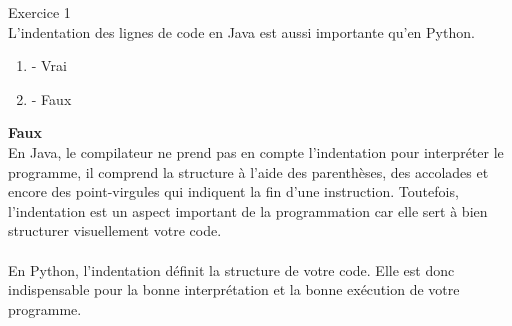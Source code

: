 \begin{Exercice}[2 minutes] Exercice 1\\
L'indentation des lignes de code en Java est aussi importante qu'en Python.
\begin{enumerate}
    \item - Vrai
    \item - Faux
\end{enumerate}
\begin{solution}
    \textbf{Faux}
    \\En Java, le compilateur ne prend pas en compte l'indentation pour interpréter le programme, il comprend la structure à l'aide des parenthèses, des accolades et encore des point-virgules qui indiquent la fin d'une instruction. Toutefois, l'indentation est un aspect important de la programmation car elle sert à bien structurer visuellement votre code.\\\\
    En Python, l'indentation définit la structure de votre code. Elle est donc indispensable pour la bonne interprétation et la bonne exécution de votre programme. 
\end{solution}
\end{Exercice}




